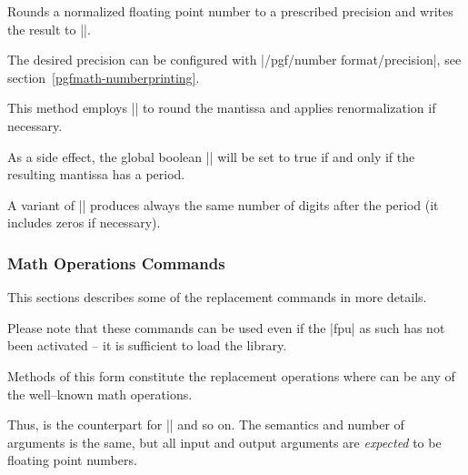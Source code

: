 \begin{command}{}
	Rounds a normalized floating point number to a prescribed precision and writes the result to |\pgfmathresult|.

	The desired precision can be configured with |/pgf/number format/precision|, see section~\ref{pgfmath-numberprinting}. 
	
	This method employs |\pgfmathroundto| to round the mantissa and applies renormalization if necessary.

	As a side effect, the global boolean |\ifpgfmathfloatroundhasperiod| will be set to true if and only if the resulting mantissa has a period.
\begin{codeexample}[]
\pgfmathfloatround{\pgfmathresult}
\pgfmathfloattosci{\pgfmathresult}
\pgfmathresult
\end{codeexample}
\begin{codeexample}[]
\pgfmathfloatround{\pgfmathresult}
\pgfmathfloattosci{\pgfmathresult}
\pgfmathresult
\end{codeexample}
\end{command}

\begin{command}{}
	A variant of |\pgfmathfloatround| produces always the same number of digits after the period (it includes zeros if necessary).
\begin{codeexample}[]
\pgfmathfloatroundzerofill{\pgfmathresult}
\pgfmathfloattosci{\pgfmathresult}
\pgfmathresult
\end{codeexample}
\begin{codeexample}[]
\pgfmathfloatroundzerofill{\pgfmathresult}
\pgfmathfloattosci{\pgfmathresult}
\pgfmathresult
\end{codeexample}
\end{command}

\subsubsection{Math Operations Commands}
This sections describes some of the replacement commands in more details.

Please note that these commands can be used even if the |fpu| as such has not been activated -- it is sufficient to load the library.

\begin{command}{\pgfmathfloat{}}
	Methods of this form constitute the replacement operations where  can be any of the well--known math operations.

	Thus, \declareandlabel{\pgfmathfloatadd} is the counterpart for |\pgfmathadd| and so on. The semantics and number of arguments is the same, but all input and output arguments are \emph{expected} to be floating point numbers.
\end{command}

